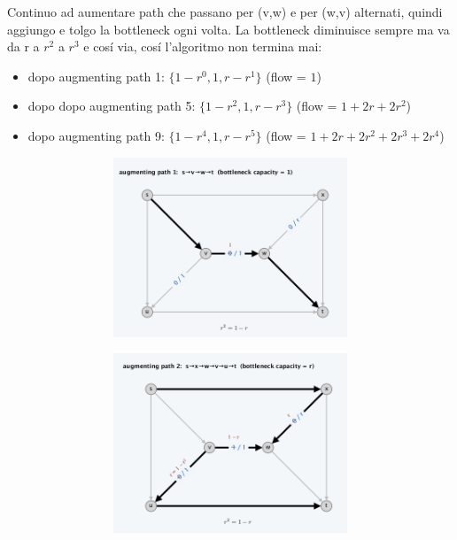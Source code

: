 Continuo ad aumentare path che passano per (v,w) e per (w,v) alternati,
quindi aggiungo e tolgo la bottleneck ogni volta. La bottleneck
diminuisce sempre ma va da r a $r^2$ a $r^3$ e cosí via, cosí
l'algoritmo non termina mai:
\begin{itemize}
	\item dopo augmenting path 1: $\{ 1 - r^0, 1, r - r^1 \}$ (flow = $1$)
	\item dopo dopo augmenting path 5: $\{ 1 - r^2, 1, r - r^3 \}$ (flow = $1 + 2r + 2r^2$)
	\item dopo augmenting path 9: $\{ 1 - r^4, 1, r - r^5 \}$ (flow = $1 + 2r + 2r^2 + 2r^3 + 2r^4$)\\
\end{itemize}
\begin{figure}[H]
	\begin{subfigure}{\textwidth}
		\centering
		\begin{subfigure}{.33\textwidth}
			\centering
			\includegraphics[width=\linewidth]{capitoli/network_flow/imgs/ex1.png}
		\end{subfigure}%
		\begin{subfigure}{.33\textwidth}
			\centering
			\includegraphics[width=\linewidth]{capitoli/network_flow/imgs/ex2.png}

\end{subfigure}
\end{subfigure}
\end{figure}
